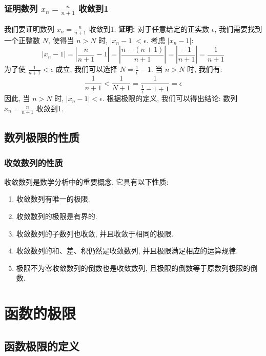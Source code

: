 \documentclass[
10pt, 
aspectratio=43, 
]{beamer}
\begin{document}
\begin{frame}
\frametitle{证明数列 $x_n=\frac{n}{n+1}$ 收敛到1}
我们要证明数列 $x_n=\frac{n}{n+1}$ 收敛到1. 
\pause
\textbf{证明: }
对于任意给定的正实数 $\epsilon$, 我们需要找到一个正整数 $N$, 使得当 $n>N$ 时, $|x_n - 1| < \epsilon$. 
\pause
考虑 $|x_n - 1|$: 
\[
|x_n - 1| = \left|\frac{n}{n+1} - 1\right| = \left|\frac{n - (n+1)}{n+1}\right| = \left|\frac{-1}{n+1}\right| = \frac{1}{n+1}
\]
\pause
为了使 $\frac{1}{n+1} < \epsilon$ 成立, 我们可以选择 $N = \frac{1}{\epsilon} - 1$. 
\pause
当 $n>N$ 时, 我们有: 
\[
\frac{1}{n+1} < \frac{1}{N+1} = \frac{1}{\frac{1}{\epsilon} - 1 + 1} = \epsilon
\]
\pause
因此, 当 $n>N$ 时, $|x_n - 1| < \epsilon$. 
\pause
根据极限的定义, 我们可以得出结论: 数列 $x_n=\frac{n}{n+1}$ 收敛到1. 
\end{frame}

\subsection{数列极限的性质}

\begin{frame}
\frametitle{收敛数列的性质}

收敛数列是数学分析中的重要概念, 它具有以下性质: 

\begin{enumerate}
\item 收敛数列有唯一的极限. 
\pause
\item 收敛数列的极限是有界的. 
\pause
\item 收敛数列的子数列也收敛, 并且收敛于相同的极限. 
\pause
\item 收敛数列的和、差、积仍然是收敛数列, 并且极限满足相应的运算规律. 
\pause
\item 极限不为零收敛数列的倒数也是收敛数列, 且极限的倒数等于原数列极限的倒数. 
\end{enumerate}

\end{frame}


\section{函数的极限}
\subsection{函数极限的定义}
\end{document}
